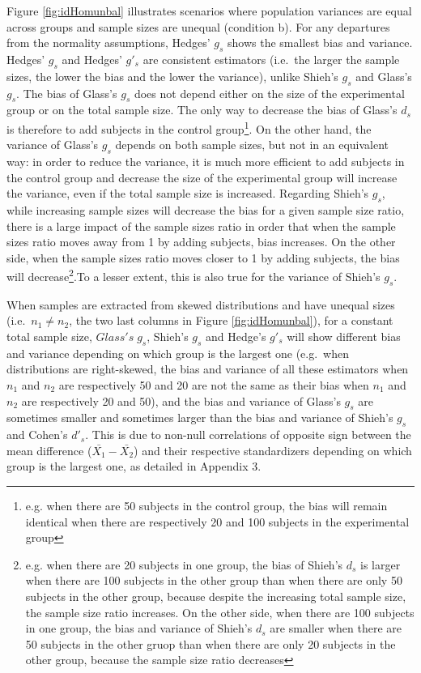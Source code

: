 \documentclass[
  man,floatsintext]{apa6}
\begin{document}
Figure \ref{fig:idHomunbal} illustrates scenarios where population variances are equal across groups and sample sizes are unequal (condition b). For any departures from the normality assumptions, Hedges' \(g_s\) shows the smallest bias and variance. Hedges' \(g_s\) and Hedges' \(g'_s\) are consistent estimators (i.e.~the larger the sample sizes, the lower the bias and the lower the variance), unlike Shieh's \(g_s\) and Glass's \(g_s\). The bias of Glass's \(g_s\) does not depend either on the size of the experimental group or on the total sample size. The only way to decrease the bias of Glass's \(d_s\) is therefore to add subjects in the control group\footnote{e.g. when there are 50 subjects in the control group, the bias will remain identical when there are respectively 20 and 100 subjects in the experimental group}. On the other hand, the variance of Glass's \(g_s\) depends on both sample sizes, but not in an equivalent way: in order to reduce the variance, it is much more efficient to add subjects in the control group and decrease the size of the experimental group will increase the variance, even if the total sample size is increased. Regarding Shieh's \(g_s\), while increasing sample sizes will decrease the bias for a given sample size ratio, there is a large impact of the sample sizes ratio in order that when the sample sizes ratio moves away from 1 by adding subjects, bias increases. On the other side, when the sample sizes ratio moves closer to 1 by adding subjects, the bias will decrease\footnote{e.g. when there are 20 subjects in one group, the bias of Shieh's $d_s$ is larger when there are 100 subjects in the other group than when there are only 50 subjects in the other group, because despite the increasing total sample size, the sample size ratio increases. On the other side, when there are 100 subjects in one group, the bias and variance of Shieh's $d_s$ are smaller when there are 50 subjects in the other gruop than when there are only 20 subjects in the other group, because the sample size ratio decreases}.To a lesser extent, this is also true for the variance of Shieh's \(g_s\).

When samples are extracted from skewed distributions and have unequal sizes (i.e.~\(n_1 \neq n_2\), the two last columns in Figure \ref{fig:idHomunbal}), for a constant total sample size, \(Glass's \; g_s\), Shieh's \(g_s\) and Hedge's \(g'_s\) will show different bias and variance depending on which group is the largest one (e.g.~when distributions are right-skewed, the bias and variance of all these estimators when \(n_1\) and \(n_2\) are respectively 50 and 20 are not the same as their bias when \(n_1\) and \(n_2\) are respectively 20 and 50), and the bias and variance of Glass's \(g_s\) are sometimes smaller and sometimes larger than the bias and variance of Shieh's \(g_s\) and Cohen's \(d'_s\). This is due to non-null correlations of opposite sign between the mean difference (\(\bar{X_1}-\bar{X_2}\)) and their respective standardizers depending on which group is the largest one, as detailed in Appendix 3.
\end{document}
